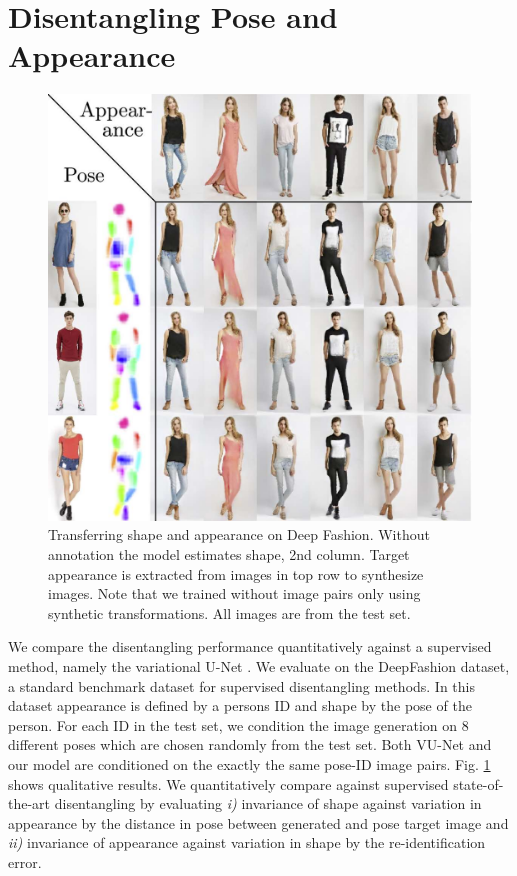 \section{Disentangling Pose and Appearance}\label{sec:poseandappearance}
		\begin{figure}[htp]
			\centering
			\includegraphics[trim={0cm 0cm 0cm 0cm},clip, width=.5\linewidth]{fig/factor/swappy}
			\caption{Transferring shape and appearance on Deep Fashion. Without annotation the model estimates shape, 2nd column. Target appearance is extracted from images in top row to synthesize images. Note that we trained without image pairs only using synthetic transformations.
			All images are from the test set.}
			\label{fig:allswaps}
		\end{figure}

		We compare the disentangling performance quantitatively against a supervised method, namely the variational U-Net \cite{Esser:2018ue}. We evaluate on the DeepFashion \cite{liu16deepfashion, liu16deepfashionwild} dataset, a standard benchmark dataset for supervised disentangling methods. In this dataset appearance is defined by a persons ID and shape by the pose of the person. For each ID in the test set, we condition the image generation on 8 different poses which are chosen randomly from the test set. Both VU-Net and our model are conditioned on the exactly the same pose-ID image pairs. Fig. \ref{fig:allswaps} shows qualitative results.
		We quantitatively compare against supervised state-of-the-art disentangling \cite{esser18} by evaluating \emph{i)} invariance of shape against variation in appearance by the distance in pose between generated and pose target image and \emph{ii)} invariance of appearance against variation in shape by the re-identification error.

